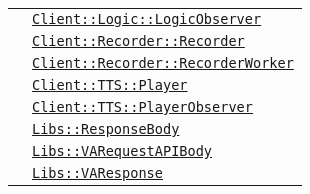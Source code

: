 \begin{longtable}{|>{\centering}m{3cm}|m{10cm}<{\centering}|}
& \hyperref[Client::Logic::LogicObserver]{\texttt{Client::Logic::LogicObserver}}\\
& \hyperref[Client::Recorder::Recorder]{\texttt{Client::Recorder::Recorder}}\\
& \hyperref[Client::Recorder::RecorderWorker]{\texttt{Client::Recorder::RecorderWorker}}\\
& \hyperref[Client::TTS::Player]{\texttt{Client::TTS::Player}}\\
& \hyperref[Client::TTS::PlayerObserver]{\texttt{Client::TTS::PlayerObserver}}\\
& \hyperref[Libs::ResponseBody]{\texttt{Libs::ResponseBody}}\\
& \hyperref[Libs::VARequestAPIBody]{\texttt{Libs::VARequestAPIBody}}\\
& \hyperref[Libs::VAResponse]{\texttt{Libs::VAResponse}}\\ \hline


\end{longtable}
